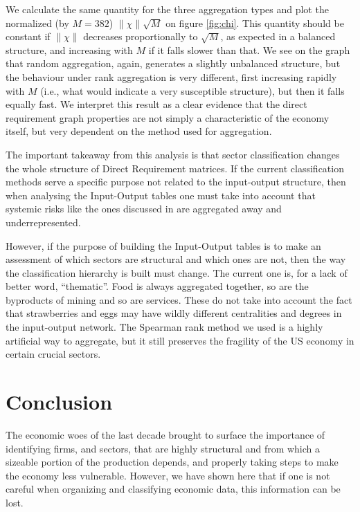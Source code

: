 We calculate the same quantity for the three aggregation types
and plot the normalized (by $M=382$) $\|\chi\|\sqrt{M}$ on figure
\ref{fig:chi}. This quantity should be constant if $\|\chi\|$ decreases
proportionally to $\sqrt{M}$, as expected in a balanced structure, and
increasing with $M$ if it falls slower than that. We see on the graph
that random aggregation, again, generates a slightly unbalanced
structure, but the behaviour under rank aggregation is very different,
first increasing rapidly with $M$ (i.e., what would indicate a very
susceptible structure), but then it falls equally fast. We interpret
this result as a clear evidence that the direct requirement graph
properties are not simply a characteristic of the economy itself, but
very dependent on the method used for aggregation.

The important takeaway from this analysis is that sector
classification changes the whole structure of Direct Requirement
matrices. If the current classification methods serve a specific
purpose not related to the input-output structure, then when analysing
the Input-Output tables one must take into account that systemic risks like the
ones discussed in \cite{Acemoglu12} are aggregated away and
underrepresented.

However, if the purpose of building the Input-Output tables is to
make an assessment of which sectors are structural and which ones are
not, then the way the classification
hierarchy is built must change. The current one is, for a lack of better word,
``thematic''. Food is always aggregated together, so are the byproducts of
mining and so are services. These do not take into account the fact
that strawberries and eggs may have wildly different centralities and
degrees in the input-output network. The Spearman rank method we used
is a highly artificial way to aggregate, but it still preserves the
fragility of the US economy in certain crucial sectors.


\section{Conclusion}

The economic woes of the last decade brought to surface the importance
of identifying firms, and sectors, that are highly structural and from
which a sizeable portion of the production depends, and properly taking
steps to make the economy less vulnerable. However, we have shown here
that if one is not careful when organizing and classifying economic
data, this information can be lost.

